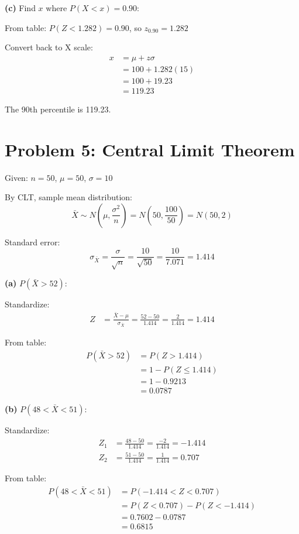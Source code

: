 \documentclass[10pt,twocolumn]{article}
\begin{document}
\textbf{(c)} Find $x$ where $P(X < x) = 0.90$:

From table: $P(Z < 1.282) = 0.90$, so $z_{0.90} = 1.282$

Convert back to X scale:
\begin{align*}
x &= \mu + z\sigma \\
&= 100 + 1.282(15) \\
&= 100 + 19.23 \\
&= \boxed{119.23}
\end{align*}

The 90th percentile is 119.23.

\section*{Problem 5: Central Limit Theorem}

Given: $n = 50$, $\mu = 50$, $\sigma = 10$

By CLT, sample mean distribution:
$$\bar{X} \sim N\left(\mu, \frac{\sigma^2}{n}\right) = N\left(50, \frac{100}{50}\right) = N(50, 2)$$

Standard error:
$$\sigma_{\bar{X}} = \frac{\sigma}{\sqrt{n}} = \frac{10}{\sqrt{50}} = \frac{10}{7.071} = 1.414$$

\textbf{(a)} $P(\bar{X} > 52)$:

Standardize:
\begin{align*}
Z &= \frac{\bar{X} - \mu}{\sigma_{\bar{X}}} = \frac{52-50}{1.414} = \frac{2}{1.414} = 1.414
\end{align*}

From table:
\begin{align*}
P(\bar{X} > 52) &= P(Z > 1.414) \\
&= 1 - P(Z \leq 1.414) \\
&= 1 - 0.9213 \\
&= \boxed{0.0787}
\end{align*}

\textbf{(b)} $P(48 < \bar{X} < 51)$:

Standardize:
\begin{align*}
Z_1 &= \frac{48-50}{1.414} = \frac{-2}{1.414} = -1.414 \\
Z_2 &= \frac{51-50}{1.414} = \frac{1}{1.414} = 0.707
\end{align*}

From table:
\begin{align*}
P(48 < \bar{X} < 51) &= P(-1.414 < Z < 0.707) \\
&= P(Z < 0.707) - P(Z < -1.414) \\
&= 0.7602 - 0.0787 \\
&= \boxed{0.6815}
\end{align*}
\end{document}
